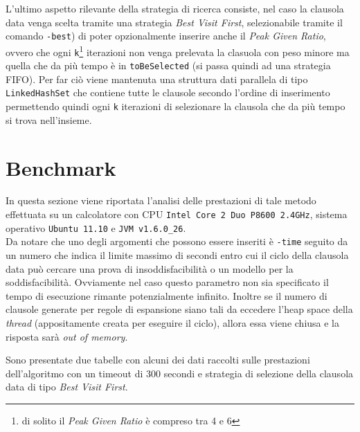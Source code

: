 \documentclass[a4paper,11pt]{article}
\begin{document}
L'ultimo aspetto rilevante della strategia di ricerca consiste, nel caso la clausola data venga scelta tramite una strategia \emph{Best Visit First}, selezionabile tramite il comando \texttt{-best}) di poter opzionalmente inserire anche il \emph{Peak Given Ratio}, ovvero che ogni \texttt{k}\footnote{di solito il \emph{Peak Given Ratio} è compreso tra 4 e 6} iterazioni non venga prelevata la clasuola con peso minore ma quella che da più tempo è in \texttt{toBeSelected} (si passa quindi ad una strategia FIFO). Per far ciò viene mantenuta una struttura dati parallela di tipo \texttt{LinkedHashSet} che contiene tutte le clausole secondo l'ordine di inserimento permettendo quindi ogni \texttt{k} iterazioni di selezionare la clausola che da più tempo si trova nell'insieme.

\section{Benchmark}
In questa sezione viene riportata l'analisi delle prestazioni di tale metodo effettuata su un calcolatore con CPU \texttt{Intel Core 2 Duo P8600 2.4GHz}, sistema operativo \texttt{Ubuntu 11.10} e \texttt{JVM v1.6.0\_26}.\\
Da notare che uno degli argomenti che possono essere inseriti è \texttt{-time} seguito da un numero che indica il limite massimo di secondi entro cui il ciclo della clausola data può cercare una prova di insoddisfacibilità o un modello per la soddisfacibilità. Ovviamente nel caso questo parametro non sia specificato il tempo di esecuzione rimante potenzialmente infinito. Inoltre se il numero di clausole generate per regole di espansione siano tali da eccedere l'heap space della \emph{thread} (appositamente creata per eseguire il ciclo), allora essa viene chiusa e la risposta sarà \emph{out of memory}.\par
Sono presentate due tabelle con alcuni dei dati raccolti sulle prestazioni dell'algoritmo con un timeout di 300 secondi e  strategia di selezione della clausola data di tipo \emph{Best Visit First}.
\end{document}
